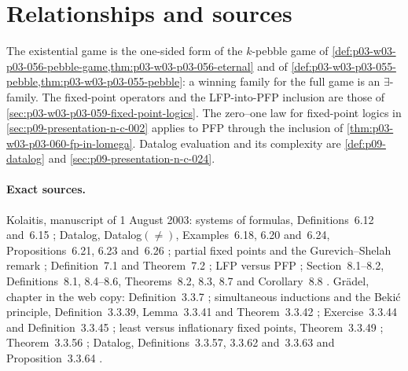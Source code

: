 \section{Relationships and sources}
\label{sec:p03-w03-p03-060-relationships}

The existential game is the one-sided form of the \(k\)-pebble game of
\cref{def:p03-w03-p03-056-pebble-game,thm:p03-w03-p03-056-eternal} and of
\cref{def:p03-w03-p03-055-pebble,thm:p03-w03-p03-055-pebble}: a winning
family for the full game is an \(\exists\)-family. The fixed-point
operators and the LFP-into-PFP inclusion are those of
\cref{sec:p03-w03-p03-059-fixed-point-logics}. The zero--one law for
fixed-point logics in \cref{sec:p09-presentation-n-c-002} applies to PFP
through the inclusion of \cref{thm:p03-w03-p03-060-fp-in-lomega}. Datalog
evaluation and its complexity are \cref{def:p09-datalog} and
\cref{sec:p09-presentation-n-c-024}.

\paragraph{Exact sources.} Kolaitis, manuscript of 1 August 2003:
systems of formulas, Definitions~6.12 and~6.15 \cite[pp.~39--40]{Kolaitis2003ExpressivePowerNotes};
Datalog, Datalog\((\neq)\), Examples~6.18, 6.20 and~6.24, Propositions~6.21,
6.23 and~6.26 \cite[pp.~42--46]{Kolaitis2003ExpressivePowerNotes};
partial fixed points and the Gurevich--Shelah remark \cite[pp.~49--51]{Kolaitis2003ExpressivePowerNotes};
Definition~7.1 and Theorem~7.2 \cite[pp.~52--54]{Kolaitis2003ExpressivePowerNotes};
LFP versus PFP \cite[pp.~67--68]{Kolaitis2003ExpressivePowerNotes};
Section~8.1--8.2, Definitions~8.1, 8.4--8.6, Theorems~8.2, 8.3, 8.7 and
Corollary~8.8 \cite[pp.~69--73]{Kolaitis2003ExpressivePowerNotes}.
Gr\"adel, chapter in the web copy: Definition~3.3.7 \cite[p.~155]{Gradel2007FMTDescriptiveChapter};
simultaneous inductions and the Beki\'c principle, Definition~3.3.39,
Lemma~3.3.41 and Theorem~3.3.42 \cite[pp.~171--173]{Gradel2007FMTDescriptiveChapter};
Exercise~3.3.44 and Definition~3.3.45 \cite[p.~174]{Gradel2007FMTDescriptiveChapter};
least versus inflationary fixed points, Theorem~3.3.49 \cite[pp.~175--176]{Gradel2007FMTDescriptiveChapter};
Theorem~3.3.56 \cite[p.~180]{Gradel2007FMTDescriptiveChapter}; Datalog,
Definitions~3.3.57, 3.3.62 and~3.3.63 and Proposition~3.3.64
\cite[pp.~180--182]{Gradel2007FMTDescriptiveChapter}.
